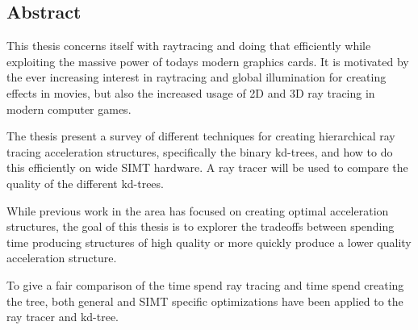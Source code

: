 

\begin{center}
\begin{minipage}{0.7\textwidth}
\section*{Abstract}

This thesis concerns itself with raytracing and doing that efficiently
while exploiting the massive power of todays modern graphics cards. It
is motivated by the ever increasing interest in raytracing and global
illumination for creating effects in movies, but also the increased
usage of 2D and 3D ray tracing in modern computer games.

The thesis present a survey of different techniques for creating
hierarchical ray tracing acceleration structures, specifically the
binary kd-trees, and how to do this efficiently on wide SIMT
hardware. A ray tracer will be used to compare the quality of the
different kd-trees.

While previous work in the area has focused on creating optimal
acceleration structures, the goal of this thesis is to explorer the
tradeoffs between spending time producing structures of high quality
or more quickly produce a lower quality acceleration structure.

To give a fair comparison of the time spend ray tracing and time spend
creating the tree, both general and SIMT specific optimizations have
been applied to the ray tracer and kd-tree.

\end{minipage}
\end{center}










